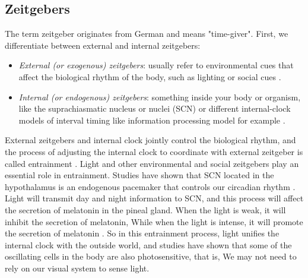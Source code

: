 \documentclass[sigconf]{acmart}
\begin{document}
\subsection{Zeitgebers}



The term zeitgeber originates from German and means "time-giver". First, we differentiate between external and internal zeitgebers:

\begin{itemize}
\item \emph{External (or exogenous) zeitgebers}: usually refer to environmental cues that affect the biological rhythm of the body, such as lighting \cite{aschoff1965circadian} or social cues \cite{ehlers1988social}.
\item \emph{Internal (or endogenous) zeitgebers}: something inside your body or organism, like the suprachiasmatic nucleus or nuclei (SCN) \cite{buijs2003circadian} or different internal-clock models of interval timing like information processing model for example \cite{gibbon1984scalar}.
\end{itemize}


External zeitgebers and internal clock jointly control the biological rhythm, and the process of adjusting the internal clock to coordinate with external zeitgeber is called entrainment \cite{duffy2005entrainment}. Light and other environmental and social zeitgebers play an essential role in entrainment. Studies have shown that SCN located in the hypothalamus is an endogenous pacemaker that controls our circadian rhythm \cite{albrecht2003mammalian}. Light will transmit day and night information to SCN, and this process will affect the secretion of melatonin in the pineal gland. When the light is weak, it will inhibit the secretion of melatonin, While when the light is intense, it will promote the secretion of melatonin \cite{duffy2005entrainment}. So in this entrainment process, light unifies the internal clock with the outside world, and studies have shown that some of the oscillating cells in the body are also photosensitive, that is, We may not need to rely on our visual system to sense light.
\end{document}
